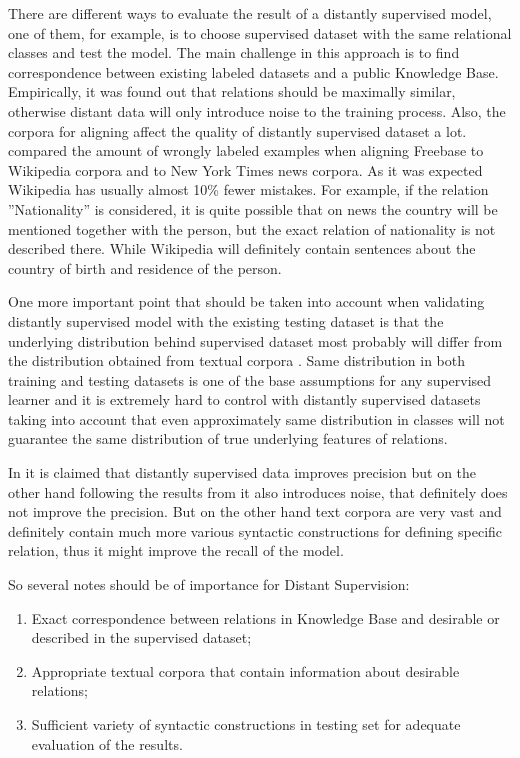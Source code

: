 There are different ways to evaluate the result of a 
distantly supervised model, one of them, for example, is to choose supervised dataset with the 
same relational classes and test the model. The main challenge in this approach is to find 
correspondence between existing labeled datasets and a public Knowledge Base. Empirically, it was 
found out that relations should be maximally similar, otherwise distant data will only introduce 
noise to the training process. Also, the corpora for aligning affect the quality of distantly 
supervised dataset a lot. \cite{riedel2010modeling} compared the amount of wrongly labeled 
examples when aligning Freebase to Wikipedia corpora and to New York Times news corpora. 
As it was expected Wikipedia has usually almost 10\% fewer mistakes. For example, if the 
relation ''Nationality'' is considered, it is quite possible that on news the country will be mentioned 
together with the person, but the exact relation of nationality is not described there. While 
Wikipedia will definitely contain sentences about the country of birth and residence of the person.

One more important point that should be taken into account when validating distantly supervised 
model with the existing testing dataset is that the underlying distribution behind supervised dataset 
most probably will differ from the distribution obtained from textual corpora 
\cite{craven1999constructing}. Same distribution in both training and testing datasets is one of the 
base assumptions for any supervised learner and it is extremely hard to control with distantly 
supervised datasets taking into account that even approximately same distribution in classes 
will not guarantee the same distribution of true underlying features of relations. 

In \cite{craven1999constructing} it is claimed that distantly supervised data improves precision 
but on the other hand following the results from \cite{riedel2010modeling} it also introduces 
noise, that definitely does not improve the precision. But on the other hand text corpora are 
very vast and definitely contain much more various syntactic constructions for defining 
specific relation, thus it might improve the recall of the model.

So several notes should be of importance for Distant Supervision:
\begin{enumerate}
  \item Exact correspondence between relations in Knowledge Base and desirable or described in 
  the supervised dataset;
  \item Appropriate textual corpora that contain information about desirable relations;
  \item Sufficient variety of syntactic constructions in testing set for adequate evaluation of the 
  results.
\end{enumerate}

